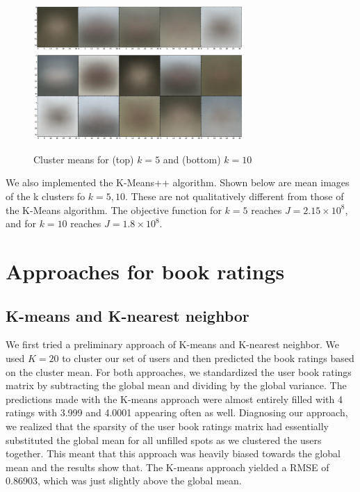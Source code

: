 \documentclass[11pt]{amsart}
\begin{document}
\begin{figure}[h]
	\centering
	\includegraphics[width=8cm]{images/kplus5us.png}\\
	\includegraphics[width=8cm]{images/kplus10us.png}\\
	\caption{Cluster means for (top) $k=5$ and (bottom) $k=10$}
\end{figure}

We also implemented the K-Means++ algorithm. Shown below are mean images of the k clusters fo $k=5,10$. These are not qualitatively different from those of the K-Means algorithm. The objective function for $k=5$ reaches $J=2.15\times 10^{8}$, and for $k=10$ reaches $J=1.8\times 10^{8}$.

\section{Approaches for book ratings}
\subsection{K-means and K-nearest neighbor}
We first tried a preliminary approach of K-means and K-nearest neighbor. We used $K = 20$ to cluster our set of users and then predicted the book ratings based on the cluster mean. For both approaches, we standardized the user book ratings matrix by subtracting the global mean and dividing by the global variance. The predictions made with the K-means approach were almost entirely filled with 4 ratings with 3.999 and 4.0001 appearing often as well. Diagnosing our approach, we realized that the sparsity of the user book ratings matrix had essentially substituted the global mean for all unfilled spots as we clustered the users together. This meant that this approach was heavily biased towards the global mean and the results show that. The K-means approach yielded a RMSE of 0.86903, which was just slightly above the global mean.
\end{document}
